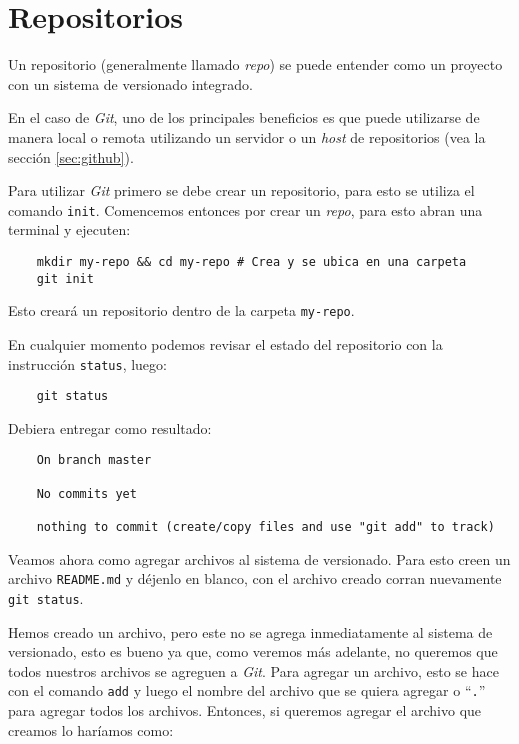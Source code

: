 \section{Repositorios}
  Un repositorio (generalmente llamado \textit{repo}) se puede entender como un proyecto
  con un sistema de versionado integrado.

  En el caso de \textit{Git}, uno de los principales beneficios es que puede utilizarse
  de manera local o remota utilizando un servidor o un \textit{host} de repositorios 
  (vea la sección \ref{sec:github}).

  Para utilizar \textit{Git} primero se debe crear un repositorio, para esto se utiliza el comando
  \texttt{init}.
  Comencemos entonces por crear un \textit{repo}, para esto abran una terminal y ejecuten:

  \begin{verbatim}
    mkdir my-repo && cd my-repo # Crea y se ubica en una carpeta
    git init
  \end{verbatim}

  Esto creará un repositorio dentro de la carpeta \texttt{my-repo}.

  En cualquier momento podemos revisar el estado del repositorio con la instrucción 
  \texttt{status}, luego:

  \begin{verbatim}
    git status
  \end{verbatim}

  Debiera entregar como resultado:

  \begin{verbatim}
    On branch master

    No commits yet

    nothing to commit (create/copy files and use "git add" to track)
  \end{verbatim}

  Veamos ahora como agregar archivos al sistema de versionado.
  Para esto creen un archivo \texttt{README.md} y déjenlo en blanco, con el archivo creado corran
  nuevamente \texttt{git status}.

  Hemos creado un archivo, pero este no se agrega inmediatamente al sistema de versionado, esto es
  bueno ya que, como veremos más adelante, no queremos que todos nuestros archivos se agreguen a 
  \textit{Git}.
  Para agregar un archivo, esto se hace con el comando \texttt{add} y luego el nombre del archivo
  que se quiera agregar o \enquote{\texttt{.}} para agregar todos los archivos.
  Entonces, si queremos agregar el archivo que creamos lo haríamos como:

